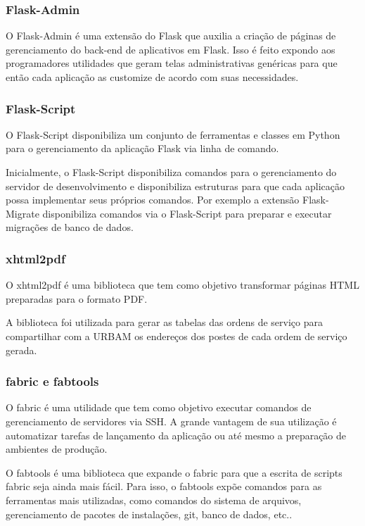 \documentclass[
	article,			%
	11pt,				%
	oneside,			%
	a4paper,			%
	english,			%
	brazil,				%
	sumario=tradicional
	]{abntex2}
\begin{document}
\subsubsection{Flask-Admin}

O Flask-Admin é uma extensão do Flask que auxilia a criação de páginas de gerenciamento do back-end de aplicativos em Flask.
Isso é feito expondo aos programadores utilidades que geram telas administrativas genéricas para que então cada aplicação as customize de acordo com suas necessidades. \cite{flaskadmin}

\subsubsection{Flask-Script}

O Flask-Script disponibiliza um conjunto de ferramentas e classes em Python para o gerenciamento da aplicação Flask via linha de comando.

Inicialmente, o Flask-Script disponibiliza comandos para o gerenciamento do servidor de desenvolvimento e disponibiliza estruturas para que cada aplicação possa implementar seus próprios comandos. \cite{flaskscript}
Por exemplo a extensão Flask-Migrate disponibiliza comandos via o Flask-Script para preparar e executar migrações de banco de dados.

\subsubsection{xhtml2pdf}

O xhtml2pdf é uma biblioteca que tem como objetivo transformar páginas HTML preparadas para o formato PDF.\cite{xhtml2pdf}

A biblioteca foi utilizada para gerar as tabelas das ordens de serviço para compartilhar com a URBAM os endereços dos postes de cada ordem de serviço gerada.

\subsubsection{fabric e fabtools}

O fabric é uma utilidade que tem como objetivo executar comandos de gerenciamento de servidores via SSH.
A grande vantagem de sua utilização é automatizar tarefas de lançamento da aplicação ou até mesmo a preparação de ambientes de produção.\cite{fabric}

O fabtools é uma biblioteca que expande o fabric para que a escrita de scripts fabric seja ainda mais fácil.
Para isso, o fabtools expõe comandos para as ferramentas mais utilizadas, como comandos do sistema de arquivos, gerenciamento de pacotes de instalações, git, banco de dados, etc.. \cite{fabtools}
\end{document}
